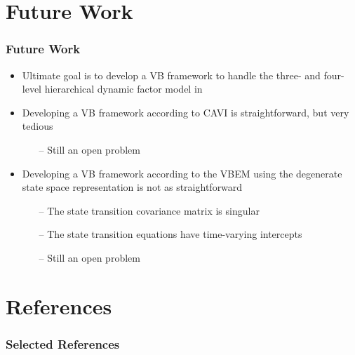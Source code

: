 \documentclass[10pt, compress, notheorems, aspectratio=169]{beamer}
\begin{document}
\section{Future Work}
\begin{frame}
	\frametitle{Future Work}
	\begin{itemize}
		\item Ultimate goal is to develop a VB framework to handle the three- and four-level hierarchical dynamic factor model in \cite{moenchDynamicHierarchicalFactor2013}		
		\item Developing a VB framework according to CAVI is straightforward, but very tedious
			\begin{itemize}
				\item[--] Still an open problem
			\end{itemize}
		\item Developing a VB framework according to the VBEM using the degenerate state space representation is not as straightforward
			\begin{itemize}
				\item[--] The state transition covariance matrix is singular
				\item[--] The state transition equations have time-varying intercepts
				\item[--] Still an open problem
			\end{itemize}
	\end{itemize}
\end{frame}

\section{References}
\begin{frame}[allowframebreaks]
	\frametitle{Selected References}
	\printbibliography
\end{frame}
\end{document}
